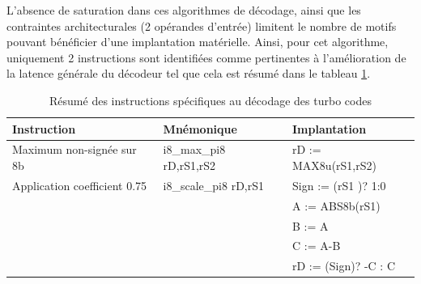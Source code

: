 \documentclass[../main.tex]{subfiles}
\begin{document}
L'absence de saturation dans ces algorithmes de décodage, ainsi que les contraintes architecturales (2 opérandes d'entrée) limitent le nombre de motifs pouvant bénéficier d'une implantation matérielle. Ainsi, pour cet algorithme, uniquement 2 instructions sont identifiées comme pertinentes à l'amélioration de la latence générale du décodeur tel que cela est résumé dans le tableau \ref{instrus_turbo}.

\begin{table}[tb]
    \footnotesize
    \centering
    \begin{tabular}{l|| l l}
    \hline
        \textbf{Instruction} & \textbf{Mnémonique} & \textbf{Implantation}  \\
    \hline
        Maximum non-signée sur 8b       & i8\_max\_pi8 rD,rS1,rS2   & rD\hspace{2.5mm} := MAX8u(rS1,rS2)           \\ 
        Application coefficient 0.75    & i8\_scale\_pi8  rD,rS1    & Sign  := (rS1 \geqslant 0 )? 1:0  \\
                                        &                           & A\hspace{4mm}     := ABS8b(rS1)                 \\
                                        &                           & B\hspace{4mm}     := A\gg2                     \\
                                        &                           & C\hspace{4mm}     := A-B                      \\
                                        &                           & rD\hspace{2.5mm}    := (Sign)? -C : C           \\
    \hline
    \end{tabular}
    
    \caption{Résumé des instructions spécifiques au décodage des turbo codes}
    \label{instrus_turbo}
    \end{table}
\end{document}

